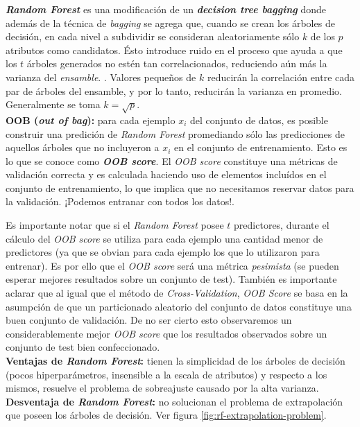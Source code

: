 \textit{\textbf{Random Forest}} es una modificación de un \textit{\textbf{decision tree bagging}} donde además de la técnica de \textit{bagging} se agrega que, cuando se crean los árboles de decisión, en cada nivel a subdividir se consideran aleatoriamente sólo $k$ de los $p$ atributos como candidatos. Ésto introduce ruido en el proceso que ayuda a que los $t$ árboles generados no estén tan correlacionados, reduciendo aún más la varianza del \textit{ensamble}. \cite{breiman-2001}. 
Valores pequeños de $k$ reducirán la correlación entre cada par de árboles del ensamble, y por lo tanto, reducirán la varianza en promedio. Generalmente se toma $k = \sqrt{p}$. \\

\textbf{OOB (\textit{out of bag}):} para cada ejemplo $x_i$ del conjunto de datos, es posible construir una predición de \textit{Random Forest} promediando sólo las predicciones de aquellos árboles que no incluyeron a $x_i$ en el conjunto de entrenamiento. Esto es lo que se conoce como \textit{\textbf{OOB score}}. El \textit{OOB score} constituye una métricas de validación correcta y es calculada haciendo uso de elementos incluídos en el conjunto de entrenamiento, lo que implica que no necesitamos reservar datos para la validación. ¡Podemos entranar con todos los datos!.

Es importante notar que si el \textit{Random Forest} posee $t$ predictores, durante el cálculo del \textit{OOB score} se utiliza para cada ejemplo una cantidad menor de predictores (ya que se obvian para cada ejemplo los que lo utilizaron para entrenar). Es por ello que el \textit{OOB score} será una métrica \textit{pesimista} (se pueden esperar mejores resultados sobre un conjunto de test). También es importante aclarar que al igual que el método de \textit{Cross-Validation}, \textit{OOB Score} se basa en la asumpción de que un particionado aleatorio del conjunto de datos constituye una buen conjunto de validación. De no ser cierto esto observaremos un considerablemente mejor \textit{OOB score} que los resultados observados sobre un conjunto de test bien confeccionado.\\

\textbf{Ventajas de \textit{Random Forest}:} tienen la simplicidad de los árboles de decisión (pocos hiperparámetros, insensible a la escala de atributos) y respecto a los mismos, resuelve el problema de sobreajuste causado por la alta varianza.\\

\textbf{Desventaja de \textit{Random Forest}:} no solucionan el problema de extrapolación que poseen los árboles de decisión. Ver figura \ref{fig:rf-extrapolation-problem}.

